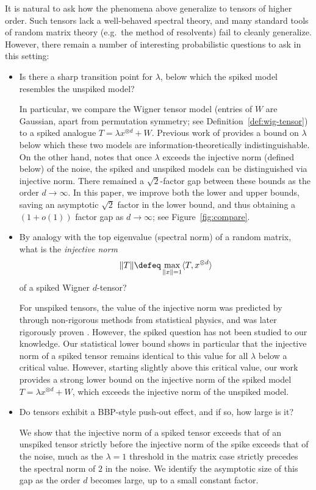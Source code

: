 \documentclass{article}
\begin{document}
It is natural to ask how the phenomena above generalize to tensors of higher order. Such tensors lack a well-behaved spectral theory, and many standard tools of random matrix theory (e.g.\ the method of resolvents) fail to cleanly generalize. However, there remain a number of interesting probabilistic questions to ask in this setting:
\begin{itemize}
\item Is there a sharp transition point for $\lambda$, below which the spiked model resembles the unspiked model?

In particular, we compare the Wigner tensor model (entries of $W$ are Gaussian, \iid apart from permutation symmetry; see Definition~\ref{def:wig-tensor}) to a spiked analogue $T = \lambda x^{\otimes d} + W$. Previous work of \cite{mrz} provides a bound on $\lambda$ below which these two models are information-theoretically indistinguishable. On the other hand, \cite{rm} notes that once $\lambda$ exceeds the injective norm (defined below) of the noise, the spiked and unspiked models can be distinguished via injective norm. There remained a $\sqrt{2}$-factor gap between these bounds as the order $d \to \infty$. In this paper, we improve both the lower and upper bounds, saving an asymptotic $\sqrt{2}$ factor in the lower bound, and thus obtaining a $(1 + o(1))$ factor gap as $d \to \infty$; see Figure~\ref{fig:compare}.

\item By analogy with the top eigenvalue (spectral norm) of a random matrix, what is the \emph{injective norm}
$$ \|T\| \defeq \max_{\|x\|=1} \langle T, x^{\otimes d} \rangle $$
of a spiked Wigner $d$-tensor?

For unspiked tensors, the value of the injective norm was predicted by \cite{cs92} through non-rigorous methods from statistical physics, and was later rigorously proven \cite{tal06,abac,subag-pspin}. However, the spiked question has not been studied to our knowledge. Our statistical lower bound shows in particular that the injective norm of a spiked tensor remains identical to this value for all $\lambda$ below a critical value. However, starting slightly above this critical value, our work provides a strong lower bound on the injective norm of the spiked model $T = \lambda x^{\otimes d} + W$, which exceeds the injective norm of the unspiked model.

\item Do tensors exhibit a BBP-style push-out effect, and if so, how large is it?

We show that the injective norm of a spiked tensor exceeds that of an unspiked tensor strictly before the injective norm of the spike exceeds that of the noise, much as the $\lambda=1$ threshold in the matrix case strictly precedes the spectral norm of $2$ in the noise. We identify the asymptotic size of this gap as the order $d$ becomes large, up to a small constant factor.


\end{itemize}
\end{document}
